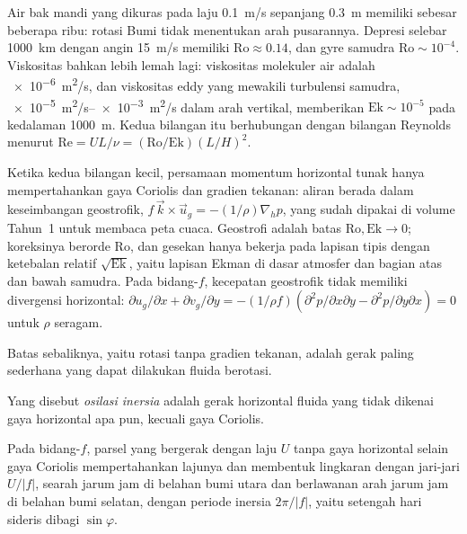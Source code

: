 Air bak mandi yang dikuras pada laju \qty{0.1}{m/s} sepanjang \qty{0.3}{m} memiliki  sebesar
beberapa ribu: rotasi Bumi tidak menentukan arah
pusarannya. Depresi selebar \qty{1000}{km} dengan angin \qty{15}{m/s} memiliki
$\mathrm{Ro} \approx 0.14$, dan gyre samudra $\mathrm{Ro} \sim 10^{-4}$.
Viskositas bahkan lebih lemah lagi: viskositas molekuler air adalah
\qty{e-6}{m^2/s}, dan viskositas eddy yang mewakili turbulensi
samudra, \qtyrange{e-5}{e-3}{m^2/s} dalam arah vertikal, memberikan
$\mathrm{Ek} \sim 10^{-5}$ pada kedalaman \qty{1000}{m}. Kedua bilangan itu
berhubungan dengan bilangan Reynolds menurut $\mathrm{Re} = UL/\nu =
(\mathrm{Ro}/\mathrm{Ek})(L/H)^2$.

Ketika kedua bilangan kecil, persamaan momentum horizontal tunak
hanya mempertahankan gaya Coriolis dan gradien tekanan: aliran berada dalam
keseimbangan geostrofik, $f\,\vec k\times\vec u_g = -(1/\rho)\nabla_h p$, yang
sudah dipakai di volume Tahun~1 untuk membaca peta cuaca. Geostrofi adalah batas
$\mathrm{Ro}, \mathrm{Ek}\to 0$; koreksinya berorde
$\mathrm{Ro}$, dan gesekan hanya bekerja pada lapisan tipis dengan ketebalan relatif
$\sqrt{\mathrm{Ek}}$, yaitu lapisan Ekman di dasar atmosfer dan
bagian atas dan bawah samudra. Pada bidang-$f$, kecepatan geostrofik
tidak memiliki divergensi horizontal: $\partial u_g/\partial x + \partial
v_g/\partial y = -(1/\rho f)(\partial^2 p/\partial x\partial y -
\partial^2 p/\partial y\partial x) = 0$ untuk $\rho$ seragam.

Batas sebaliknya, yaitu rotasi tanpa gradien tekanan, adalah gerak
paling sederhana yang dapat dilakukan fluida berotasi.

\begin{definition}\label{def:b3:gfd-foundations:inertial}
Yang disebut \emph{osilasi inersia} adalah
gerak horizontal fluida yang tidak dikenai gaya horizontal apa pun,
kecuali gaya Coriolis.
\end{definition}

\begin{theorem}\label{thm:b3:gfd-foundations:inertial}
Pada bidang-$f$, parsel yang bergerak dengan laju $U$ tanpa gaya horizontal
selain gaya Coriolis mempertahankan lajunya dan membentuk lingkaran dengan jari-jari
$U/|f|$, searah jarum jam di belahan bumi utara dan berlawanan arah jarum jam di
belahan bumi selatan, dengan periode inersia $2\pi/|f|$, yaitu setengah hari sideris
dibagi $\sin\varphi$.
\end{theorem}

